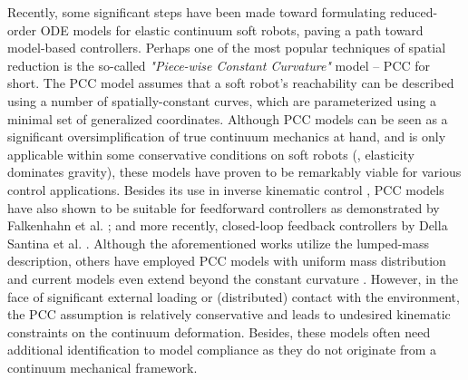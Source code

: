 Recently, some significant steps have been made toward formulating reduced-order ODE models for elastic continuum soft robots, paving a path toward model-based controllers. Perhaps one of the most popular techniques of spatial reduction is the so-called \textit{"Piece-wise Constant Curvature"} model -- PCC for short. The PCC model assumes that a soft robot's reachability can be described using a number of spatially-constant curves, which are parameterized using a minimal set of generalized coordinates. Although PCC models can be seen as a significant oversimplification of true continuum mechanics at hand, and is only applicable within some conservative conditions on soft robots (\eg, elasticity dominates gravity), these models have proven to be remarkably viable for various control applications. Besides its use in inverse kinematic control \cite{Marchese2014,Marchese2016,Jones2006}, PCC models have also shown to be suitable for feedforward controllers as demonstrated by Falkenhahn et al. \cite{Falkenhahn2015}; and more recently, closed-loop feedback controllers by Della Santina et al. \cite{DellaSantina2020,Katzschmann2019}. Although the aforementioned works utilize the lumped-mass description, others have employed PCC models with uniform mass distribution \cite{Renda2018,Godage2015,Godage2016,Tatlicioglu2007,Tatlicioglu2007a} and current models even extend beyond the constant curvature \cite{Mochiyama2003,Chirikjian1994,DellaSantina2020}. However, in the face of significant external loading or (distributed) contact with the environment, the PCC assumption is relatively conservative and leads to undesired kinematic constraints on the continuum deformation. Besides, these models often need additional identification to model compliance as they do not originate from a continuum mechanical framework.

